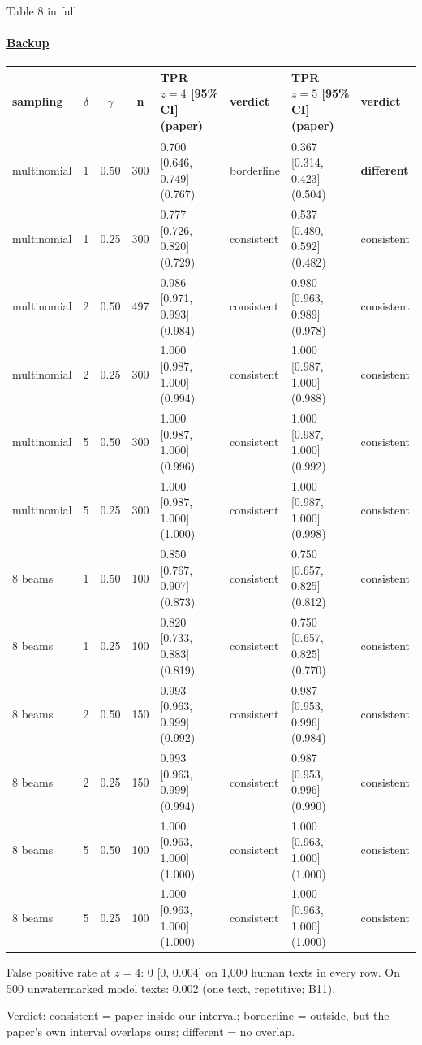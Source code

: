 \documentclass[aspectratio=169,10pt,t]{beamer}
\newcommand{\quiet}[1]{\textcolor{muted}{#1}}
\newcommand{\warn}[1]{\textcolor{signal}{\textbf{#1}}}
\begin{document}
\begin{frame}[label=b5]{Table 8 in full}
  \framesubtitle{\hyperlink{b0}{Backup}}
  \scriptsize
  \begin{center}
  \begin{tabular}{@{}lcccllll@{}}
    \toprule
    sampling & $\delta$ & $\gamma$ & n & TPR $z = 4$ [95\% CI] (paper) & verdict & TPR $z = 5$ [95\% CI] (paper) & verdict \\
    \midrule
    multinomial & 1 & 0.50 & 300 & 0.700 [0.646, 0.749] (0.767) & borderline & 0.367 [0.314, 0.423] (0.504) & \warn{different} \\
    multinomial & 1 & 0.25 & 300 & 0.777 [0.726, 0.820] (0.729) & consistent & 0.537 [0.480, 0.592] (0.482) & consistent \\
    multinomial & 2 & 0.50 & 497 & 0.986 [0.971, 0.993] (0.984) & consistent & 0.980 [0.963, 0.989] (0.978) & consistent \\
    multinomial & 2 & 0.25 & 300 & 1.000 [0.987, 1.000] (0.994) & consistent & 1.000 [0.987, 1.000] (0.988) & consistent \\
    multinomial & 5 & 0.50 & 300 & 1.000 [0.987, 1.000] (0.996) & consistent & 1.000 [0.987, 1.000] (0.992) & consistent \\
    multinomial & 5 & 0.25 & 300 & 1.000 [0.987, 1.000] (1.000) & consistent & 1.000 [0.987, 1.000] (0.998) & consistent \\
    \midrule
    8 beams & 1 & 0.50 & 100 & 0.850 [0.767, 0.907] (0.873) & consistent & 0.750 [0.657, 0.825] (0.812) & consistent \\
    8 beams & 1 & 0.25 & 100 & 0.820 [0.733, 0.883] (0.819) & consistent & 0.750 [0.657, 0.825] (0.770) & consistent \\
    8 beams & 2 & 0.50 & 150 & 0.993 [0.963, 0.999] (0.992) & consistent & 0.987 [0.953, 0.996] (0.984) & consistent \\
    8 beams & 2 & 0.25 & 150 & 0.993 [0.963, 0.999] (0.994) & consistent & 0.987 [0.953, 0.996] (0.990) & consistent \\
    8 beams & 5 & 0.50 & 100 & 1.000 [0.963, 1.000] (1.000) & consistent & 1.000 [0.963, 1.000] (1.000) & consistent \\
    8 beams & 5 & 0.25 & 100 & 1.000 [0.963, 1.000] (1.000) & consistent & 1.000 [0.963, 1.000] (1.000) & consistent \\
    \bottomrule
  \end{tabular}
  \end{center}
  \vspace{0.3em}
  \small
  False positive rate at $z = 4$: 0 [0, 0.004] on 1{,}000 human texts in every row. On 500 unwatermarked model texts: 0.002 (one text, repetitive; B11).\par
  \quiet{\scriptsize Verdict: consistent = paper inside our interval; borderline = outside, but the paper's own interval overlaps ours; different = no overlap.}
\end{frame}
\end{document}
